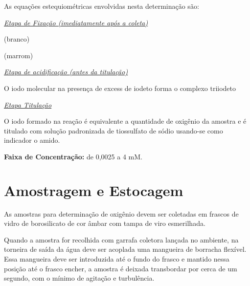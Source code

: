 \documentclass[a4paper,10pt]{SelfArx}
\begin{document}
As equações estequiométricas envolvidas nesta determinação são:

\textit {\underline{ Etapa de Fixação (imediatamente após a coleta)}}
\vspace{0.25cm}

 (branco)
\vspace{0.15cm}

 (marrom)
\vspace{0.15cm}

\textit{\underline {Etapa de acidificação (antes da titulação)}}
\vspace{0.25cm}

\vspace{0.15cm}

\vspace{0.15cm}

O iodo molecular na presença de excess de iodeto forma o complexo triiodeto 
\vspace{0.15cm}

\textit{\underline {Etapa Titulação}}
\vspace{0.25cm}

\vspace{0.15cm}

O iodo formado na reação é equivalente a quantidade de oxigênio da amostra e é titulado com solução padronizada de tiossulfato de sódio usando-se como indicador o amido.
\vspace{0.25cm}

\textbf{Faixa de Concentração:} de 0,0025 a 4 mM.

\section{Amostragem e Estocagem}


As amostras para determinação de oxigênio devem ser coletadas em frascos de vidro de borosilicato de cor âmbar com tampa de viro esmerilhada. 

Quando a amostra for recolhida com garrafa coletora lançada no ambiente, na torneira de saída da água deve ser acoplada uma mangueira de borracha flexível. Essa mangueira deve ser introduzida até o fundo do frasco e mantido nessa posição até o frasco encher, a amostra é deixada transbordar por cerca de um segundo, com o mínimo de agitação e turbulência. 
\end{document}
